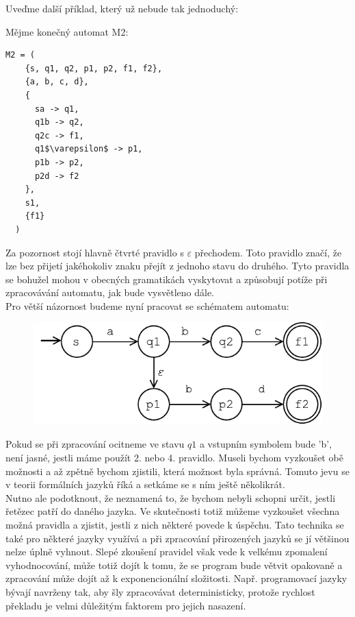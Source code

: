 \noindent
Uveďme další příklad, který už nebude tak jednoduchý:
\begin{exmp}
  Mějme konečný automat M2:
  \begin{lstlisting}[mathescape]
  M2 = (
    {s, q1, q2, p1, p2, f1, f2},
    {a, b, c, d},
    {
      sa -> q1,
      q1b -> q2,
      q2c -> f1,
      q1$\varepsilon$ -> p1,
      p1b -> p2,
      p2d -> f2
    },
    s1,
    {f1}
  )
  \end{lstlisting}

  Za pozornost stojí hlavně čtvrté pravidlo s $\varepsilon$ přechodem.
  Toto pravidlo značí, že lze bez přijetí jakéhokoliv znaku přejít z jednoho stavu
  do druhého. Tyto pravidla se bohužel mohou v obecných gramatikách vyskytovat a
  způsobují potíže při zpracovávání automatu, jak bude vysvětleno dále.\\

  \noindent
  Pro větší názornost budeme nyní pracovat se schématem automatu:

  \begin{figure}[H]
    \centering
    \includegraphics{fig/finiteAutomat1.pdf}
  \end{figure}

  Pokud se při zpracování ocitneme ve stavu $q1$ a vstupním symbolem bude 'b',
  není jasné, jestli máme použít 2. nebo 4. pravidlo. Museli bychom vyzkoušet obě možnosti
  a až zpětně bychom zjistili, která možnost byla správná. Tomuto jevu se v teorii
  formálních jazyků říká  a setkáme
  se s ním ještě několikrát.\\

  Nutno ale podotknout, že  neznamená to, že bychom nebyli schopni
  určit, jestli řetězec patří do daného jazyka. Ve skutečnosti totiž můžeme
  vyzkoušet všechna možná pravidla a zjistit, jestli z nich některé povede k úspěchu.
  Tato technika se také pro některé jazyky využívá a při zpracování
  přirozených jazyků se jí většinou nelze úplně vyhnout.
  Slepé zkoušení pravidel však vede k velkému zpomalení vyhodnocování,
  může totiž dojít k tomu, že se program bude větvit opakovaně
  a zpracování může dojít až k exponencionální složitosti.
  Např. programovací jazyky bývají navrženy tak, aby šly zpracovávat deterministicky,
  protože rychlost překladu je velmi důležitým faktorem pro jejich nasazení.\\


\end{exmp}

